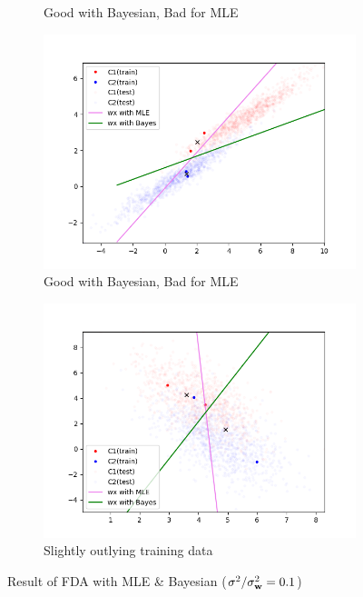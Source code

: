 \documentclass{article} %
\begin{document}
\begin{figure}[ht]
\begin{subfigure}{.5\textwidth}
	\caption{Good with Bayesian, Bad for MLE}
	\label{fg:fda2}
\end{subfigure}
\begin{subfigure}{.5\textwidth}
	\centering
	\includegraphics[width=\textwidth]{Figure_5.png}
	\caption{Good with Bayesian, Bad for MLE}
	\label{fg:fda3}
\end{subfigure}
\begin{subfigure}{.5\textwidth}
	\centering
	\includegraphics[width=\textwidth]{Figure_6.png}
	\caption{Slightly outlying training data}
	\label{fg:fda4}
\end{subfigure}
\caption{Result of FDA with MLE \& Bayesian ($\sigma^2 / \sigma^2_{\bf w} = 0.1$)}
\label{fg:fdares}
\end{figure}
\end{document}

